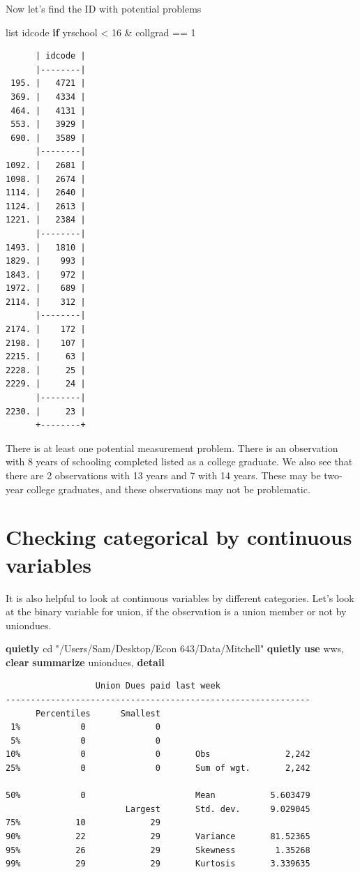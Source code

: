 \documentclass[
]{book}
\newenvironment{Shaded}{\begin{snugshade}}{\end{snugshade}}
\newcommand{\KeywordTok}[1]{\textcolor[rgb]{0.13,0.29,0.53}{\textbf{#1}}}
\newcommand{\NormalTok}[1]{#1}
\newcommand{\OtherTok}[1]{\textcolor[rgb]{0.56,0.35,0.01}{#1}}
\newcommand{\StringTok}[1]{\textcolor[rgb]{0.31,0.60,0.02}{#1}}
\begin{document}
Now let's find the ID with potential problems

\begin{Shaded}
\begin{Highlighting}[]
\OtherTok{list}\NormalTok{ idcode }\KeywordTok{if}\NormalTok{ yrschool \textless{} 16 \& collgrad == 1}
\end{Highlighting}
\end{Shaded}

\begin{verbatim}
      | idcode |
      |--------|
 195. |   4721 |
 369. |   4334 |
 464. |   4131 |
 553. |   3929 |
 690. |   3589 |
      |--------|
1092. |   2681 |
1098. |   2674 |
1114. |   2640 |
1124. |   2613 |
1221. |   2384 |
      |--------|
1493. |   1810 |
1829. |    993 |
1843. |    972 |
1972. |    689 |
2114. |    312 |
      |--------|
2174. |    172 |
2198. |    107 |
2215. |     63 |
2228. |     25 |
2229. |     24 |
      |--------|
2230. |     23 |
      +--------+
\end{verbatim}

There is at least one potential measurement problem. There is an observation with 8 years of schooling completed listed as a college graduate. We also see that there are 2 observations with 13 years and 7 with 14 years. These may be two-year college graduates, and these observations may not be problematic.

\section{Checking categorical by continuous variables}\label{checking-categorical-by-continuous-variables}

It is also helpful to look at continuous variables by different categories. Let's look at the binary variable for union, if the observation is a union member or not by uniondues.

\begin{Shaded}
\begin{Highlighting}[]
\KeywordTok{quietly}\NormalTok{ cd }\StringTok{"/Users/Sam/Desktop/Econ 643/Data/Mitchell"}
\KeywordTok{quietly} \KeywordTok{use}\NormalTok{ wws, }\KeywordTok{clear}
\KeywordTok{summarize}\NormalTok{ uniondues, }\KeywordTok{detail}
\end{Highlighting}
\end{Shaded}

\begin{verbatim}
                  Union Dues paid last week
-------------------------------------------------------------
      Percentiles      Smallest
 1%            0              0
 5%            0              0
10%            0              0       Obs               2,242
25%            0              0       Sum of wgt.       2,242

50%            0                      Mean           5.603479
                        Largest       Std. dev.      9.029045
75%           10             29
90%           22             29       Variance       81.52365
95%           26             29       Skewness        1.35268
99%           29             29       Kurtosis       3.339635
\end{verbatim}
\end{document}

